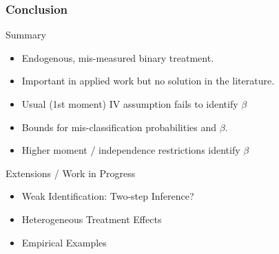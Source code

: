 \documentclass{beamer}
\begin{document}
\begin{frame}
  \frametitle{Conclusion}

  \begin{block}{Summary}
  \begin{itemize}
    \item Endogenous, mis-measured binary treatment.
    \item Important in applied work but no solution in the literature.
      \item Usual (1st moment) IV assumption fails to identify $\beta$
      \item Bounds for mis-classification probabilities and $\beta$.
      \item Higher moment / independence restrictions identify $\beta$
   \end{itemize}
  \end{block}

  \begin{block}{Extensions / Work in Progress}
    \begin{itemize}
      \item Weak Identification: Two-step Inference?
      \item Heterogeneous Treatment Effects 
      \item Empirical Examples
    \end{itemize}
  \end{block}
\end{frame}
\appendix
\end{document}
